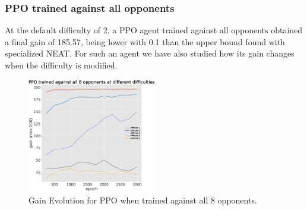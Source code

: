 \documentclass[conference]{IEEEtran}
\begin{document}
    \subsubsection{PPO trained against all opponents}
    At the default difficulty of 2, a PPO agent trained against all opponents
    obtained a final gain of 185.57, being lower with 0.1 than the
    upper bound found with specialized NEAT\@.
    For such an agent we have also studied how its gain changes when the difficulty
    is modified.
    \begin{figure}[htbp]
    \centering
    \includegraphics[width=0.5\textwidth]{images/general_harmonic_gain.eps}
    \caption{Gain Evolution for PPO when trained against all 8 opponents.}
    \label{fig:ppo_train_8}
    \end{figure}
\end{document}
